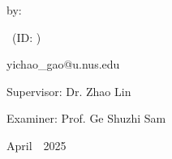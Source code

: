 \begin{titlepage}
\begin{center}
   by:
\end{center}
\begin{flushleft} \large
\begin{center}
    \reportauthorOne~(ID: \cidOne)\\ %
\end{center}
\begin{center}
    yichao\_gao@u.nus.edu
\end{center}

\end{flushleft}
\vspace{0.5cm}
\begin{center}\large
    Supervisor: Dr. Zhao Lin
\end{center}
\begin{center}\large
    Examiner: Prof. Ge Shuzhi Sam
\end{center}
\makeatletter
\vspace{1cm}
\begin{center}
    April~~2025
\end{center}

\vfill %





\end{titlepage}

